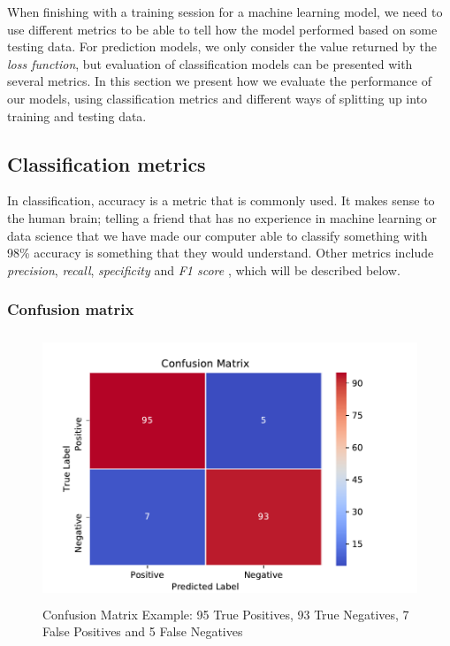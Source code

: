 When finishing with a training session for a machine learning model, we need to use different metrics to be able to tell how the model performed based on some testing data. For prediction models, we only consider the value returned by the \textit{loss function}, but evaluation of classification models can be presented with several metrics. In this section we present how we evaluate the performance of our models, using classification metrics and different ways of splitting up into training and testing data.

\subsection{Classification metrics}
In classification, accuracy is a metric that is commonly used. It makes sense to the human brain; telling a friend that has no experience in machine learning or data science that we have made our computer able to classify something with 98\% accuracy is something that they would understand. Other metrics include \textit{precision}, \textit{recall}, \textit{specificity} and \textit{F1 score} \cite{GarciaCeja2018_classification_bipolar}, which will be described below.

\subsubsection{Confusion matrix}

\begin{figure}[h]
  \begin{center}
    \includegraphics[height=8cm]{img/conf_matrix.pdf}
    \caption{Confusion Matrix Example: 95 True Positives, 93 True Negatives, 7 False Positives and 5 False Negatives}
    \label{figure:confusion_matrix_bipolar}
  \end{center}
\end{figure}

